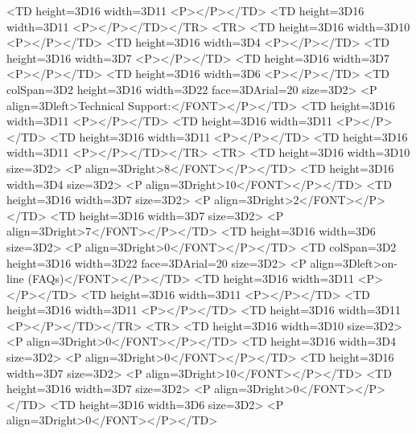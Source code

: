         <TD height=3D16 width=3D11%
            <P></P></TD>
        <TD height=3D16 width=3D11%
            <P></P></TD></TR>
    <TR>
        <TD height=3D16 width=3D10%
            <P></P></TD>
        <TD height=3D16 width=3D4%
            <P></P></TD>
        <TD height=3D16 width=3D7%
            <P></P></TD>
        <TD height=3D16 width=3D7%
            <P></P></TD>
        <TD height=3D16 width=3D6%
            <P></P></TD>
        <TD colSpan=3D2 height=3D16 width=3D22%
face=3DArial=20
            size=3D2>
            <P align=3Dleft>Technical Support:</FONT></P></TD>
        <TD height=3D16 width=3D11%
            <P></P></TD>
        <TD height=3D16 width=3D11%
            <P></P></TD>
        <TD height=3D16 width=3D11%
            <P></P></TD>
        <TD height=3D16 width=3D11%
            <P></P></TD></TR>
    <TR>
        <TD height=3D16 width=3D10%
size=3D2>
            <P align=3Dright>8</FONT></P></TD>
        <TD height=3D16 width=3D4%
size=3D2>
            <P align=3Dright>10</FONT></P></TD>
        <TD height=3D16 width=3D7%
size=3D2>
            <P align=3Dright>2</FONT></P></TD>
        <TD height=3D16 width=3D7%
size=3D2>
            <P align=3Dright>7</FONT></P></TD>
        <TD height=3D16 width=3D6%
size=3D2>
            <P align=3Dright>0</FONT></P></TD>
        <TD colSpan=3D2 height=3D16 width=3D22%
face=3DArial=20
            size=3D2>
            <P align=3Dleft>on-line (FAQs)</FONT></P></TD>
        <TD height=3D16 width=3D11%
            <P></P></TD>
        <TD height=3D16 width=3D11%
            <P></P></TD>
        <TD height=3D16 width=3D11%
            <P></P></TD>
        <TD height=3D16 width=3D11%
            <P></P></TD></TR>
    <TR>
        <TD height=3D16 width=3D10%
size=3D2>
            <P align=3Dright>0</FONT></P></TD>
        <TD height=3D16 width=3D4%
size=3D2>
            <P align=3Dright>0</FONT></P></TD>
        <TD height=3D16 width=3D7%
size=3D2>
            <P align=3Dright>10</FONT></P></TD>
        <TD height=3D16 width=3D7%
size=3D2>
            <P align=3Dright>0</FONT></P></TD>
        <TD height=3D16 width=3D6%
size=3D2>
            <P align=3Dright>0</FONT></P></TD>
